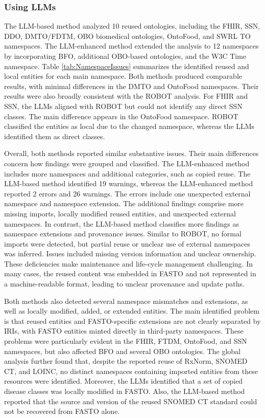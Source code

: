 \documentclass[
]{ceurart}
\begin{document}
\subsubsection{Using LLMs}

The LLM-based method analyzed 10 reused ontologies, including the FHIR, SSN, DDO, DMTO/FDTM, OBO biomedical ontologies, OntoFood, and SWRL TO namespaces. The LLM-enhanced method extended the analysis to 12 namespaces by incorporating BFO, additional OBO-based ontologies, and the W3C Time namespace. Table \ref{tab:NamespaceIssues} summarizes the identified reused and local entities for each main namespace. Both methods produced comparable results, with minimal differences in the DMTO and OntoFood namespaces. Their results were also broadly consistent with the ROBOT analysis. For FHIR and SSN, the LLMs aligned with ROBOT but could not identify any direct SSN classes. The main difference appears in the OntoFood namespace. ROBOT classified the entities as local due to the changed namespace, whereas the LLMs identified them as direct classes. 

Overall, both methods reported similar substantive issues. Their main differences concern how findings were grouped and classified. The LLM-enhanced method includes more namespaces and additional categories, such as copied reuse. The LLM-based method identified 19 warnings, whereas the LLM-enhanced method reported 2 errors and 26 warnings. The errors include one unexpected external namespace and namespace extension. The additional findings comprise more missing imports, locally modified reused entities, and unexpected external namespaces. In contrast, the LLM-based method classifies more findings as namespace extensions and provenance issues.
Similar to ROBOT, no formal imports were detected, but partial reuse or unclear use of external namespaces was inferred. Issues included missing version information and unclear ownership. These deficiencies make maintenance and life-cycle management challenging. In many cases, the reused content was embedded in FASTO and not represented in a machine-readable format, leading to unclear provenance and update paths.

Both methods also detected several namespace mismatches and extensions, as well as locally modified, added, or extended entities. The main identified problem is that reused entities and FASTO-specific extensions are not clearly separated by IRIs, with FASTO entities minted directly in third-party namespaces. These problems were particularly evident in the FHIR, FTDM, OntoFood, and SSN namespaces, but also affected BFO and several OBO ontologies. The global analysis further found that, despite the reported reuse of RxNorm, SNOMED CT, and LOINC, no distinct namespaces containing imported entities from these resources were identified. Moreover, the LLMs identified that a set of copied disease classes was locally modified in FASTO. Also, the LLM-based method reported that the source and version of the reused SNOMED CT standard could not be recovered from FASTO alone.
\end{document}
